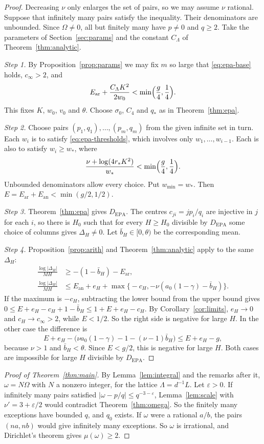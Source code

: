 \documentclass[11pt]{amsart}
\theoremstyle{definition}
\theoremstyle{remark}
\numberwithin{equation}{section}
\newcommand{\Ear}{E_{\mathrm{ar}}}
\newcommand{\Ean}{E_{\mathrm{an}}}
\newcommand{\bb}{\bar b}
\begin{document}
\begin{proof}
Decreasing $\nu$ only enlarges the set of pairs, so we may assume $\nu$ rational. Suppose that infinitely many
pairs satisfy the inequality. Their denominators are unbounded. Since $\Omega\ne0$, all but finitely many have
$p\ne0$ and $q\ge2$. Take the parameters of Section~\ref{sec:params} and the constant $C_\Lambda$ of
Theorem~\ref{thm:analytic}.

\emph{Step 1.} By Proposition~\ref{prop:params} we may fix $m$ so large that \eqref{eq:epa-base} holds,
$c_\infty>2$, and
\[
 \Ear+\frac{C_\Lambda K^2}{2w_0}<\min\Bigl(\frac g4,\frac14\Bigr).
\]
This fixes $K$, $w_0$, $v_0$ and $\theta$. Choose $\sigma_0$, $C_4$ and $q_*$ as in Theorem~\ref{thm:epa}.

\emph{Step 2.} Choose pairs $(p_1,q_1),\dots,(p_m,q_m)$ from the given infinite set in turn. Each $w_i$ is to
satisfy \eqref{eq:epa-thresholds}, which involves only $w_1,\dots,w_{i-1}$. Each is also to satisfy $w_i\ge w_*$,
where
\[
 \frac{\nu+\log(4r_*K^2)}{w_*}<\min\Bigl(\frac g4,\frac14\Bigr).
\]
Unbounded denominators allow every choice. Put $w_{\min}=w_*$. Then $E=\Ear+\Ean<\min(g/2,1/2)$.

\emph{Step 3.} Theorem~\ref{thm:epa} gives $D_{\mathrm{EPA}}$. The centres $c_{ji}=jp_i/q_i$ are injective in
$j$ for each $i$, so there is $H_0$ such that for every $H\ge H_0$ divisible by $D_{\mathrm{EPA}}$ some choice
of columns gives $\Delta_H\ne0$. Let $\bb_H\in[0,\theta)$ be the corresponding mean.

\emph{Step 4.} Proposition~\ref{prop:arith} and Theorem~\ref{thm:analytic} apply to the same $\Delta_H$:
\begin{align*}
 \frac{\log|\Delta_H|}{MH}&\ge-(1-\bb_H)-\Ear,\\
 \frac{\log|\Delta_H|}{MH}&\le\Ean+e_H+\max\bigl\{-c_H,-\nu(a_0(1-\gamma)-\bb_H)\bigr\}.
\end{align*}
If the maximum is $-c_H$, subtracting the lower bound from the upper bound gives
$0\le E+e_H-c_H+1-\bb_H\le1+E+e_H-c_H$. By Corollary~\ref{cor:limits}, $e_H\to0$ and $c_H\to c_\infty>2$,
while $E<1/2$. So the right side is negative for large $H$. In the other case the difference is
\[
 E+e_H-\bigl(\nu a_0(1-\gamma)-1-(\nu-1)\bb_H\bigr)\le E+e_H-g,
\]
because $\nu>1$ and $\bb_H<\theta$. Since $E<g/2$, this is negative for large $H$. Both cases are impossible
for large $H$ divisible by $D_{\mathrm{EPA}}$.
\end{proof}

\begin{proof}[Proof of Theorem~\ref{thm:main}]
By Lemma~\ref{lem:integral} and the remarks after it, $\omega=N\Omega$ with $N$ a nonzero integer, for the
lattice $\Lambda=d^{-1}L$. Let $\varepsilon>0$. If infinitely many pairs satisfied
$|\omega-p/q|\le q^{-3-\varepsilon}$, Lemma~\ref{lem:scale} with $\nu'=3+\varepsilon/2$ would contradict
Theorem~\ref{thm:omega}. So the finitely many exceptions have bounded $q$, and $q_0$ exists. If $\omega$ were
a rational $a/b$, the pairs $(na,nb)$ would give infinitely many exceptions. So $\omega$ is irrational, and
Dirichlet's theorem gives $\mu(\omega)\ge2$.
\end{proof}
\end{document}
